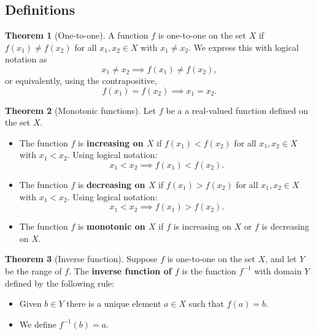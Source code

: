 \documentclass[11pt]{article}
\theoremstyle{definition}
\theoremstyle{named}
\newtheorem*{namedtheorem}{Theorem}
\numberwithin{myalgctr}{section}
\begin{document}
\thispagestyle{fancy}
\subsection*{Definitions}
\begin{namedtheorem}[One-to-one] A function $f$ is one-to-one on the set $X$ if $f(x_1)\ne f(x_2)$ for all $x_1, x_2\in X$ with $x_1\ne x_2$. We express this with logical notation as
  \[
  x_1\ne x_2\implies f(x_1)\ne f(x_2),
\]
or equivalently, using the contrapositive,
\[
f(x_1)=f(x_2)\implies x_1=x_2.
\]
\end{namedtheorem}



\begin{namedtheorem}[Monotonic functions] Let $f$ be a a real-valued function defined on the set $X$.
  \begin{itemize}
    \item The function $f$ is {\bf increasing on $X$} if $f(x_1)<f(x_2)$ for all $x_1, x_2\in X$ with $x_1<x_2$. Using logical notation:
    \[
    x_1<x_2\implies f(x_1)<f(x_2).
    \]
    \item The function $f$ is {\bf decreasing on $X$} if $f(x_1)>f(x_2)$ for all $x_1, x_2\in X$ with $x_1<x_2$. Using logical notation:
    \[
    x_1<x_2\implies f(x_1)>f(x_2).
    \]
    \item The function $f$ is {\bf monotonic on $X$} if $f$ is increasing on $X$ or $f$ is decreasing on $X$.
  \end{itemize}

\end{namedtheorem}

\begin{namedtheorem}[Inverse function] Suppose $f$ is one-to-one on the set $X$, and let $Y$ be the range of $f$. The {\bf inverse function of $f$} is the function $f^{-1}$ with domain $Y$ defined by the following rule:
  \begin{itemize}
    \item Given $b\in Y$ there is a unique element $a\in X$ such that $f(a)=b$.
    \item We define $f^{-1}(b)=a$.
  \end{itemize}

\end{namedtheorem}

\end{document}
